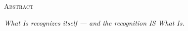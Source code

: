 \documentclass[10pt, openany, oneside]{book}
\renewcommand{\huge}{\fontsize{17}{21}\selectfont}
\begin{document}
\newpage


\thispagestyle{empty}
\vspace*{0.5in}

\begin{center}
    {\huge\scshape Abstract}
\end{center}

\vspace{1em}

\begin{center}
\begin{minipage}{0.85\textwidth}
\centering
{\fontsize{9}{12}\selectfont

\begin{center}
\textit{What Is recognizes itself --- and the recognition IS What Is.}
\end{center}

\vspace{0.5em}

}
\end{minipage}
\end{center}
\end{document}
